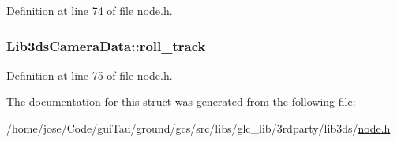 Definition at line 74 of file node.\-h.

\hypertarget{struct_lib3ds_camera_data_aa280c95e4d40f8235fee0ccb878e82bd}{
\subsubsection[{roll\-\_\-track}]{ Lib3ds\-Camera\-Data\-::roll\-\_\-track}}\label{struct_lib3ds_camera_data_aa280c95e4d40f8235fee0ccb878e82bd}


Definition at line 75 of file node.\-h.



The documentation for this struct was generated from the following file\-:\begin{DoxyCompactItemize}
\item 
/home/jose/\-Code/gui\-Tau/ground/gcs/src/libs/glc\-\_\-lib/3rdparty/lib3ds/\hyperlink{node_8h}{node.\-h}\end{DoxyCompactItemize}
